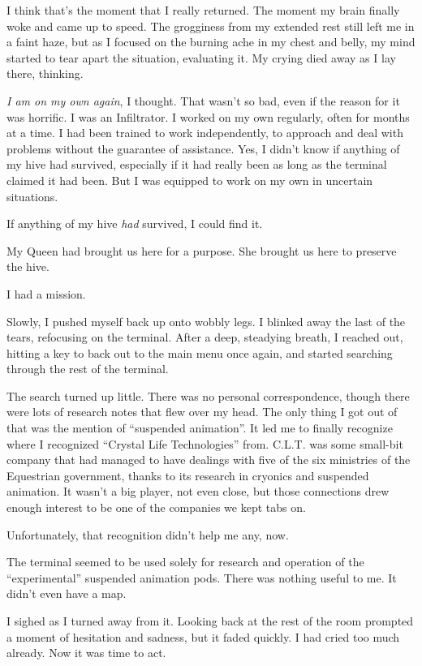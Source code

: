 I think that’s the moment that I really returned. The moment my brain finally woke and came up to speed. The grogginess from my extended rest still left me in a faint haze, but as I focused on the burning ache in my chest and belly, my mind started to tear apart the situation, evaluating it. My crying died away as I lay there, thinking.

\textit{I am on my own again}, I thought. That wasn’t so bad, even if the reason for it was horrific. I was an Infiltrator. I worked on my own regularly, often for months at a time. I had been trained to work independently, to approach and deal with problems without the guarantee of assistance. Yes, I didn’t know if anything of my hive had survived, especially if it had really been as long as the terminal claimed it had been. But I was equipped to work on my own in uncertain situations.

If anything of my hive \textit{had} survived, I could find it.

My Queen had brought us here for a purpose. She brought us here to preserve the hive.

I had a mission.

Slowly, I pushed myself back up onto wobbly legs. I blinked away the last of the tears, refocusing on the terminal. After a deep, steadying breath, I reached out, hitting a key to back out to the main menu once again, and started searching through the rest of the terminal.

The search turned up little. There was no personal correspondence, though there were lots of research notes that flew over my head. The only thing I got out of that was the mention of “suspended animation”. It led me to finally recognize where I recognized “Crystal Life Technologies” from. C.L.T. was some small-bit company that had managed to have dealings with five of the six ministries of the Equestrian government, thanks to its research in cryonics and suspended animation. It wasn’t a big player, not even close, but those connections drew enough interest to be one of the companies we kept tabs on.

Unfortunately, that recognition didn’t help me any, now.

The terminal seemed to be used solely for research and operation of the “experimental” suspended animation pods. There was nothing useful to me. It didn’t even have a map.

I sighed as I turned away from it. Looking back at the rest of the room prompted a moment of hesitation and sadness, but it faded quickly. I had cried too much already. Now it was time to act.


